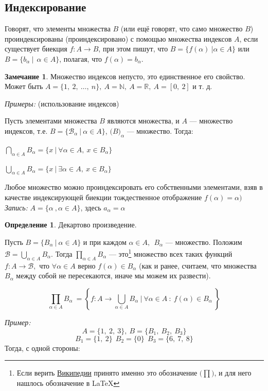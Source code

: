 \documentclass[12pt,oneside]{article}
\theoremstyle{definition}
\newtheorem{definition}{Определение}
\newtheorem{remark}{Замечание}[section]
\newcommand{\RomanNumeralCaps}[1]
    {\MakeUppercase{\romannumeral #1}}
\begin{document}
\subsection{Индексирование}\label{indexing}
Говорят, что элементы множества $B$ (или ещё говорят, что само множество $B$) проиндексированы (проиндексировано) с помощью множества индексов $A$, если существует биекция $f: A \longrightarrow B$, при этом пишут, что $B = \{f(\alpha )\ | \alpha \in A\}$ или $B = \{b_{\alpha }\ |\ \ \alpha \in A\}$, полагая, что $f(\alpha ) = b_{\alpha }$.

\begin{remark}
Множество индексов непусто, это единственное его свойство. Может быть $A = \{1,\ 2,\ \dots ,\ n\},\ A=\mathbb{N},\ A=\mathbb{R},\ A=[0,\ 2]$ и т. д.

\end{remark}
\textit{Примеры: } (использование индексов)

\RomanNumeralCaps{1} Пусть элементами множества $B$ являются множества, и $A$ --- множество индексов, т.е. $B = \{\mathcal{B}_{\alpha }\ |\ \alpha \in A\}$, $\mathcal(B)_{\alpha }$ --- множество.   Тогда:

$\displaystyle\bigcap_{\alpha \in A} B_{\alpha } = \{x\ |\ \forall \alpha \in A,\ x\in B_{\alpha }\}$

$\displaystyle\bigcup_{\alpha \in A} B_{\alpha } = \{x\ |\ \exists \alpha \in A,\ x\in B_{\alpha }\}$

\RomanNumeralCaps{2} Любое множество можно проиндексировать его собственными элементами, взяв в качестве индексирующей биекции тождественное отображение $f(\alpha) = \alpha)$
\textit{Запись: } $A = \{\alpha \ , \alpha \in A \}$, здесь $a_{\alpha } = \alpha$

\begin{definition}

\RomanNumeralCaps{3} Декартово произведение.

Пусть $B = \{B_{\alpha }\ |\ \alpha \in A\}$ и при каждом $\alpha \in A,\ \ B_{\alpha}$ --- множество. Положим $\mathscr{B} = \displaystyle\bigcup_{\alpha \in A} B_{\alpha}$. Тогда $\displaystyle\prod_{\alpha \in A} B_{\alpha}$ --- это\footnote{Если верить \href{https://en.wikipedia.org/wiki/Cartesian_product}{Википедии} принято именно это обозначение $\Big(\displaystyle\prod \Big)$, и для него нашлось обозначение в \LaTeX{}} множество всех таких функций $f : A \longrightarrow \mathscr{B},$ что  $\forall \alpha \in A$ верно $f(\alpha )\in B_{\alpha}$ (как и ранее, считаем, что множества $B_{\alpha}$ между собой не пересекаются, иначе мы можем их развести).

$$\displaystyle\prod_{\alpha \in A} B_{\alpha}\ = \left\{f : A \longrightarrow \displaystyle\bigcup_{\alpha \in A} B_{\alpha}\ |\ \forall \alpha \in A\ :\ f(\alpha)\in B_{\alpha}\ \right\}$$
\end{definition}
\textit{Пример: }
$$A = \{1,\ 2,\ 3\},\ B=\{B_1,\ B_2,\ B_3\}$$
$$B_1 = \{1,\ 2\}\ \ B_2 = \{0\}\ \ B_3 = \{6,\ 7,\ 8\}$$
Тогда, с одной стороны:
\end{document}
